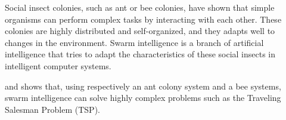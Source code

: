 
Social insect colonies, such as ant or bee colonies, have shown that simple organisms can perform complex tasks by interacting with each other. These colonies are highly distributed and self-organized, and they adapts well to changes in the environment. Swarm intelligence \citep{swarmintelligence} is a branch of artificial intelligence that tries to adapt the characteristics of these social insects in intelligent computer systems. 

\citet{acs:tsp1} and \citet{bs:tsp1} shows that, using respectively an ant colony system and a bee systems, swarm intelligence can solve highly complex problems such as the Traveling Salesman Problem (TSP).